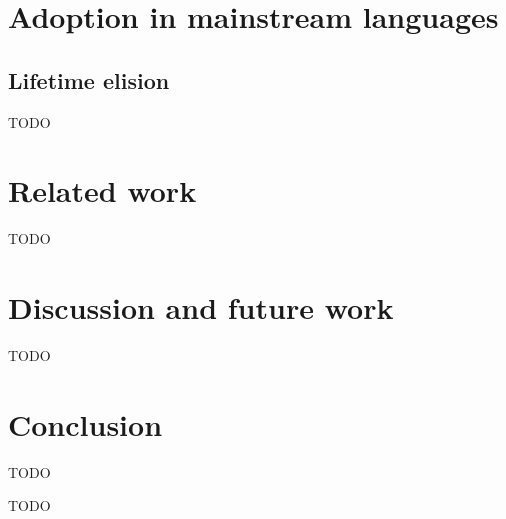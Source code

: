 \documentclass[acmsmall]{acmart}
\begin{document}
\section{Adoption in mainstream languages} \label{sec:mainstream}

\subsection{Lifetime elision} \label{subsec:lifetime-elision}


TODO %


\section{Related work} \label{sec:related}



TODO %


\section{Discussion and future work} \label{sec:discussion}


TODO %


\section{Conclusion} \label{sec:conclusion}

TODO %


\begin{acks}
    TODO %
\end{acks}



\end{document}
